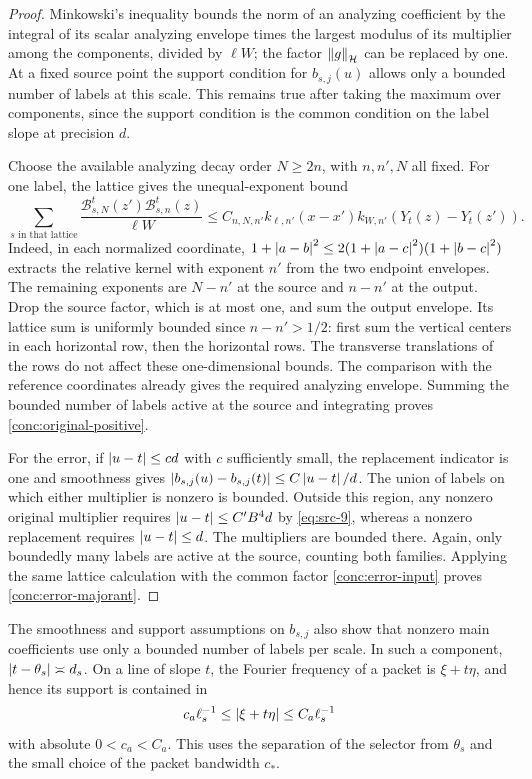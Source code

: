 \begin{proof}
Minkowski's inequality bounds the norm of an analyzing coefficient by
the integral of its scalar analyzing envelope times the largest modulus
of its multiplier among the components, divided by $\ell W$; the factor
$\left\|g\right\|_{\mathcal H}$ can be replaced by one.  At a fixed source point
the support condition for $b_{s,j}(u)$ allows only a bounded number of
labels at this scale.  This remains true after taking the maximum over
components, since the support condition is the common condition on the
label slope at precision $d$.

Choose the available analyzing decay order $N\geq2n$, with $n,n',N$
all fixed.  For one label, the lattice gives the unequal-exponent bound
\[
 \sum_{s\text{ in that lattice}}
 \frac{\mathcal B_{s,N}^{t}(z')\mathcal B_{s,n}^{t}(z)}{\ell W}
 \leq C_{n,N,n'} k_{\ell,n'}(x-x')
              k_{W,n'}(Y_t(z)-Y_t(z')).
\]
Indeed, in each normalized coordinate,
$1+\left|a-b\right|^2\leq2(1+\left|a-c\right|^2)(1+\left|b-c\right|^2)$
extracts the relative kernel with exponent $n'$ from the two endpoint
envelopes.  The remaining exponents are $N-n'$ at the source and
$n-n'$ at the output.  Drop the source factor, which is at most one,
and sum the output envelope.  Its lattice sum is uniformly bounded
since $n-n'>1/2$: first sum the vertical centers in each horizontal row,
then the horizontal rows.  The transverse translations of the rows
do not affect these one-dimensional bounds.  The comparison with the
reference coordinates already gives the required analyzing envelope.
Summing the bounded number of labels active at the source and integrating
proves
\eqref{conc:original-positive}.

For the error, if $\left|u-t\right|\leq cd$ with $c$ sufficiently small, the
replacement indicator is one and smoothness gives
$\left|b_{s,j}(u)-b_{s,j}(t)\right|\leq C\left|u-t\right|/d$.
The union of labels on which either multiplier is nonzero is bounded.
Outside this region, any nonzero original multiplier requires
$\left|u-t\right|\leq C'B^4d$ by \eqref{eq:src-9}, whereas a nonzero replacement
requires $\left|u-t\right|\leq d$.  The multipliers are bounded there.  Again,
only boundedly many labels are active at the source, counting both
families.  Applying the same lattice calculation with the common
factor \eqref{conc:error-input} proves \eqref{conc:error-majorant}.
\end{proof}

The smoothness and support assumptions on $b_{s,j}$ also show that
nonzero main coefficients use only a bounded number of labels per
scale.  In such a component,
$\left|t-\theta_s\right|\asymp d_s$.  On a line of slope $t$, the Fourier
frequency of a packet is $\xi+t\eta$, and hence its support is contained
in
\begin{equation}\label{conc:main-annuli}
 c_a\ell_s^{-1}\leq\left|\xi+t\eta\right|
                  \leq C_a\ell_s^{-1}
\end{equation}
with absolute $0<c_a<C_a$.  This uses the separation of the selector
from $\theta_s$ and the small choice of the packet bandwidth $c_*$.

